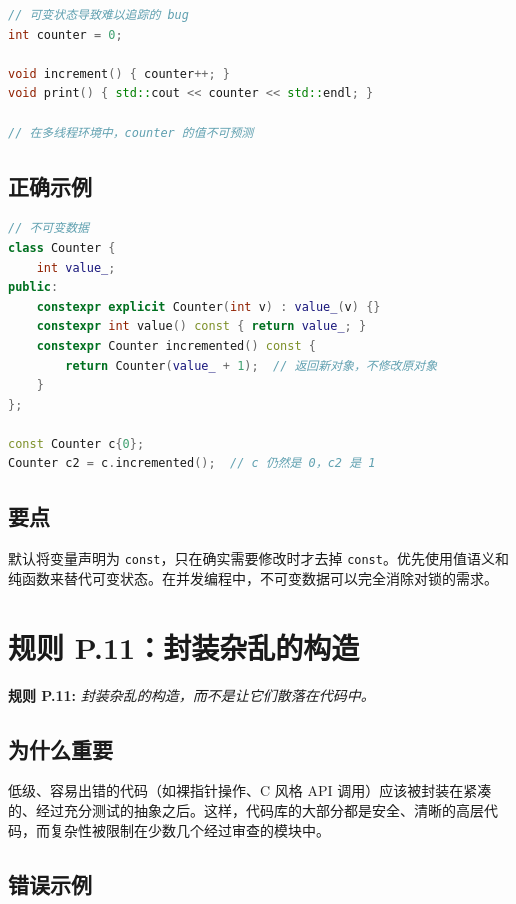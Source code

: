 \begin{lstlisting}[language=C++]
// 可变状态导致难以追踪的 bug
int counter = 0;

void increment() { counter++; }
void print() { std::cout << counter << std::endl; }

// 在多线程环境中，counter 的值不可预测
\end{lstlisting}

\subsection{正确示例}

\begin{lstlisting}[language=C++]
// 不可变数据
class Counter {
    int value_;
public:
    constexpr explicit Counter(int v) : value_(v) {}
    constexpr int value() const { return value_; }
    constexpr Counter incremented() const {
        return Counter(value_ + 1);  // 返回新对象，不修改原对象
    }
};

const Counter c{0};
Counter c2 = c.incremented();  // c 仍然是 0，c2 是 1
\end{lstlisting}

\subsection{要点}
默认将变量声明为 \texttt{const}，只在确实需要修改时才去掉 \texttt{const}。优先使用值语义和纯函数来替代可变状态。在并发编程中，不可变数据可以完全消除对锁的需求。

\section{规则 P.11：封装杂乱的构造}

\textbf{规则 P.11:} \textit{封装杂乱的构造，而不是让它们散落在代码中。}

\subsection{为什么重要}

低级、容易出错的代码（如裸指针操作、C 风格 API 调用）应该被封装在紧凑的、经过充分测试的抽象之后。这样，代码库的大部分都是安全、清晰的高层代码，而复杂性被限制在少数几个经过审查的模块中。

\subsection{错误示例}

